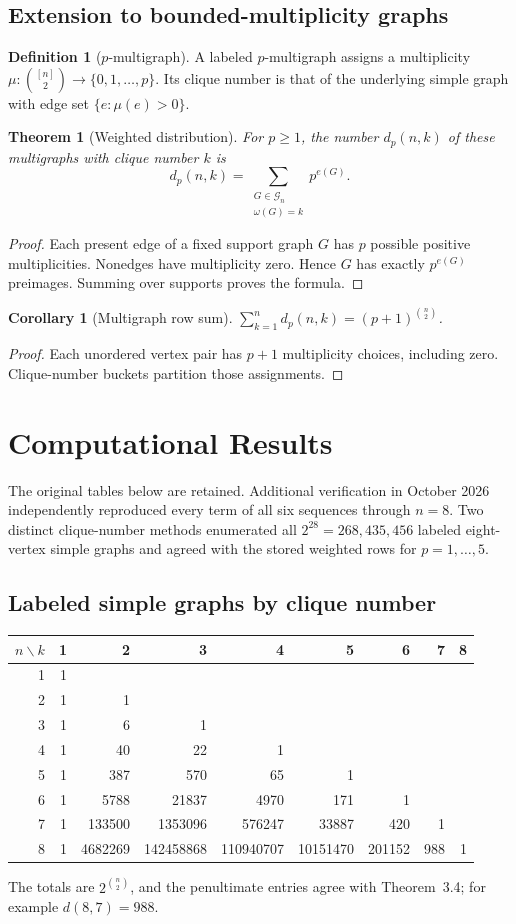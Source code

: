 \documentclass[11pt,a4paper]{article}
\newtheorem{theorem}{Theorem}[section]
\newtheorem{corollary}{Corollary}[section]
\theoremstyle{definition}
\newtheorem{definition}{Definition}[section]
\newcommand{\Graph}{\mathcal G_n}
\begin{document}
\subsection{Extension to bounded-multiplicity graphs}
\begin{definition}[$p$-multigraph]
A labeled $p$-multigraph assigns a multiplicity
$\mu:\binom{[n]}2\to\{0,1,\ldots,p\}$. Its clique number is that of
the underlying simple graph with edge set $\{e:\mu(e)>0\}$.
\end{definition}
\begin{theorem}[Weighted distribution]
For $p\geq1$, the number $d_p(n,k)$ of these multigraphs with clique
number $k$ is
\[
 d_p(n,k)=\sum_{\substack{G\in\Graph\\\omega(G)=k}}p^{e(G)}.
\]
\end{theorem}
\begin{proof}
Each present edge of a fixed support graph $G$ has $p$ possible
positive multiplicities. Nonedges have multiplicity zero. Hence $G$
has exactly $p^{e(G)}$ preimages. Summing over supports proves the
formula.
\end{proof}
\begin{corollary}[Multigraph row sum]
$\sum_{k=1}^{n}d_p(n,k)=(p+1)^{\binom n2}$.
\end{corollary}
\begin{proof}
Each unordered vertex pair has $p+1$ multiplicity choices, including
zero. Clique-number buckets partition those assignments.
\end{proof}

\section{Computational Results}
The original tables below are retained. Additional verification in
October 2026 independently reproduced every term of all six sequences
through $n=8$. Two distinct clique-number methods enumerated all
$2^{28}=268{,}435{,}456$ labeled eight-vertex simple graphs and agreed
with the stored weighted rows for $p=1,\ldots,5$.

\subsection{Labeled simple graphs by clique number}
\begin{center}\scriptsize\setlength{\tabcolsep}{4pt}
\begin{tabular}{r|rrrrrrrr}\toprule
$n\backslash k$&1&2&3&4&5&6&7&8\\\midrule
1&1\\2&1&1\\3&1&6&1\\4&1&40&22&1\\
5&1&387&570&65&1\\6&1&5788&21837&4970&171&1\\
7&1&133500&1353096&576247&33887&420&1\\
8&1&4682269&142458868&110940707&10151470&201152&988&1\\\bottomrule
\end{tabular}\end{center}
The totals are $2^{\binom n2}$, and the penultimate entries agree with
Theorem~3.4; for example $d(8,7)=988$.
\end{document}
